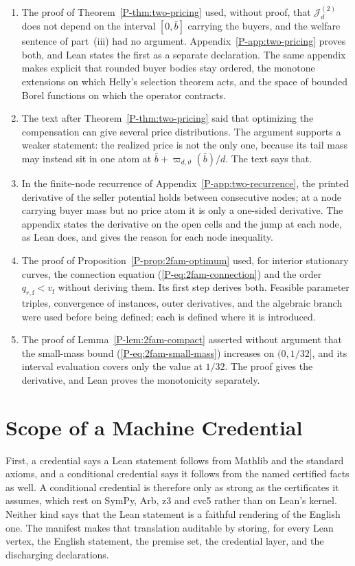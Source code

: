 \documentclass[11pt]{article}
\newcommand{\pref}[1]{\ref*{P-#1}}
\newcommand{\peqref}[1]{(\ref*{P-#1})}
\begin{document}
\begin{enumerate}
\item The proof of Theorem~\pref{thm:two-pricing} used, without proof, that
$\mathcal J_d^{(2)}$ does not depend on the interval $[0,\bar b]$ carrying
the buyers, and the welfare sentence of part~(iii) had no argument.
Appendix~\pref{app:two-pricing} proves both, and Lean states the first as a
separate declaration. The same appendix makes explicit that rounded buyer
bodies stay ordered, the monotone extensions on which Helly's selection
theorem acts, and the space of bounded Borel functions on which the
operator contracts.
\item The text after Theorem~\pref{thm:two-pricing} said that optimizing
the compensation can give several price distributions. The argument
supports a weaker statement: the realized price is not the only one,
because its tail mass may instead sit in one atom at
$\bar b+\varpi_{d,\vartheta}(\bar b)/d$. The text says that.
\item In the finite-node recurrence of
Appendix~\pref{app:two-recurrence}, the printed derivative of the seller
potential holds between consecutive nodes; at a node carrying buyer mass
but no price atom it is only a one-sided derivative. The appendix states
the derivative on the open cells and the jump at each node, as Lean does,
and gives the reason for each node inequality.
\item The proof of Proposition~\pref{prop:2fam-optimum} used, for interior
stationary curves, the connection equation \peqref{eq:2fam-connection} and
the order $q_{r,\mathrm f}<v_{\mathrm f}$ without deriving them. Its first
step derives both. Feasible parameter triples, convergence of instances,
outer derivatives, and the algebraic branch were used before being
defined; each is defined where it is introduced.
\item The proof of Lemma~\pref{lem:2fam-compact} asserted without argument
that the small-mass bound \peqref{eq:2fam-small-mass} increases on
$(0,1/32]$, and its interval evaluation covers only the value at $1/32$.
The proof gives the derivative, and Lean proves the monotonicity
separately.
\end{enumerate}

\section{Scope of a Machine Credential}

First, a credential says a Lean statement follows from Mathlib and the
standard axioms, and a conditional credential says it follows from the
named certified facts as well. A conditional credential is therefore only
as strong as the certificates it assumes, which rest on SymPy, Arb, z3 and
cvc5 rather than on Lean's kernel. Neither kind says that the Lean
statement is a faithful rendering of the English one. The manifest makes
that translation auditable by storing, for every Lean vertex, the English
statement, the premise set, the credential layer, and the discharging
declarations.
\end{document}
